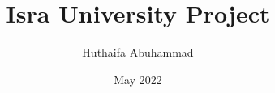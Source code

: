\usepackage [left=2.5cm, right=3.5cm, top=2cm]{geometry}
\setlength{\headheight}{14.49998pt}%

\usepackage{fancyhdr}
\pagestyle{fancy}
\usepackage{tabularx}


\usepackage[english]{babel}


\usepackage[utf8]{inputenc}
\usepackage{graphicx}

\usepackage[utf8]{inputenc}
\usepackage{graphicx}
\usepackage{titling}
\usepackage{datetime}


\linespread{1.5}


\usepackage[left=2.5cm, right=3.5cm, top=2cm]{geometry}
\usepackage{hyperref}
\hypersetup{
    colorlinks,
    citecolor=blue,
    filecolor=blue,
    linkcolor=blue,
    urlcolor=blue
}

\usepackage[acronym]{glossaries}
\makeglossaries
{}


\title{Isra University Project}
\author{Huthaifa Abuhammad}
\date{May 2022}